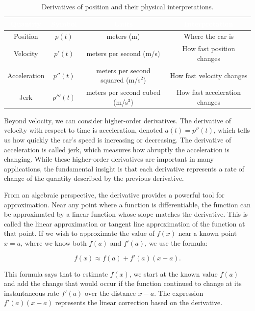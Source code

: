 \begin{table}[htbp]
\centering
\begin{tabular}{|c|c|c|c|}
\hline
\rowcolor{UofSCGarnet}
\textcolor{white}{\textbf{Quantity}} & \textcolor{white}{\textbf{Symbol}} & \textcolor{white}{\textbf{Units}} & \textcolor{white}{\textbf{Interpretation}} \\
\hline
Position & $p(t)$ & meters (m) & Where the car is \\
\hline
Velocity & $p'(t)$ & meters per second (m/s) & How fast position changes \\
\hline
Acceleration & $p''(t)$ & meters per second squared (m/s$^2$) & How fast velocity changes \\
\hline
Jerk & $p'''(t)$ & meters per second cubed (m/s$^3$) & How fast acceleration changes \\
\hline
\end{tabular}
\captionsetup{type=table}
\caption{Derivatives of position and their physical interpretations.}
\end{table}

Beyond velocity, we can consider higher-order derivatives. The derivative of velocity with respect to time is acceleration, denoted $a(t) = p''(t)$, which tells us how quickly the car's speed is increasing or decreasing. The derivative of acceleration is called jerk, which measures how abruptly the acceleration is changing. While these higher-order derivatives are important in many applications, the fundamental insight is that each derivative represents a rate of change of the quantity described by the previous derivative.

From an algebraic perspective, the derivative provides a powerful tool for approximation. Near any point where a function is differentiable, the function can be approximated by a linear function whose slope matches the derivative. This is called the linear approximation or tangent line approximation of the function at that point. If we wish to approximate the value of $f(x)$ near a known point $x = a$, where we know both $f(a)$ and $f'(a)$, we use the formula:

\[
f(x) \approx f(a) + f'(a)(x - a).
\]

This formula says that to estimate $f(x)$, we start at the known value $f(a)$ and add the change that would occur if the function continued to change at its instantaneous rate $f'(a)$ over the distance $x - a$. The expression $f'(a)(x - a)$ represents the linear correction based on the derivative.

